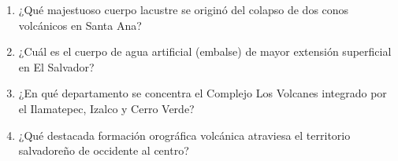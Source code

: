 \documentclass[10pt,a4paper]{article}
\begin{document}
\begin{enumerate}[label=\textbf{\arabic*.}]
\begin{enumerate}[label=\textbf{\Alph*)}]
\end{enumerate}
\vspace{0.15cm}
\item ¿Qué majestuoso cuerpo lacustre se originó del colapso de dos conos volcánicos en Santa Ana?
\begin{enumerate}[label=\textbf{\Alph*)}]
\end{enumerate}
\vspace{0.15cm}
\item ¿Cuál es el cuerpo de agua artificial (embalse) de mayor extensión superficial en El Salvador?
\begin{enumerate}[label=\textbf{\Alph*)}]
\end{enumerate}
\vspace{0.15cm}
\item ¿En qué departamento se concentra el Complejo Los Volcanes integrado por el Ilamatepec, Izalco y Cerro Verde?
\begin{enumerate}[label=\textbf{\Alph*)}]
\end{enumerate}
\vspace{0.15cm}
\item ¿Qué destacada formación orográfica volcánica atraviesa el territorio salvadoreño de occidente al centro?
\begin{enumerate}[label=\textbf{\Alph*)}]

\end{enumerate}
\end{enumerate}
\end{document}
